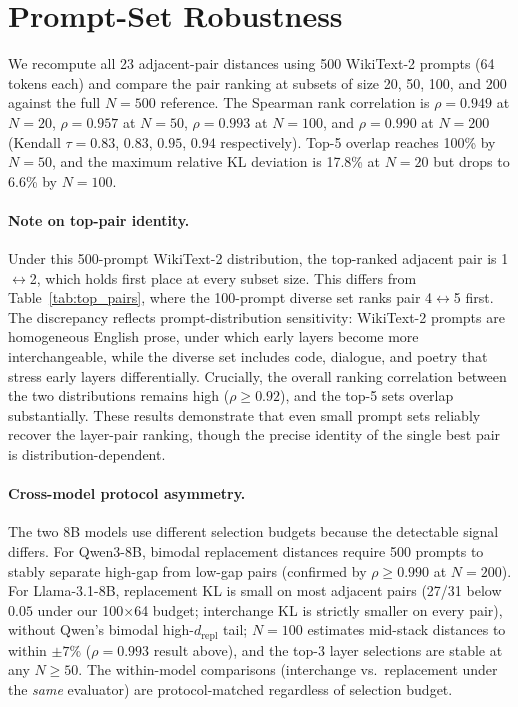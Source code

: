 \documentclass{article}
\begin{document}


\section{Prompt-Set Robustness}
\label{sec:app_prompt_robustness}

We recompute all 23 adjacent-pair distances using 500 WikiText-2 prompts (64 tokens each) and compare the pair ranking at subsets of size 20, 50, 100, and 200 against the full $N{=}500$ reference. The Spearman rank correlation is $\rho = 0.949$ at $N{=}20$, $\rho = 0.957$ at $N{=}50$, $\rho = 0.993$ at $N{=}100$, and $\rho = 0.990$ at $N{=}200$ (Kendall $\tau = 0.83$, $0.83$, $0.95$, $0.94$ respectively). Top-5 overlap reaches 100\% by $N{=}50$, and the maximum relative KL deviation is 17.8\% at $N{=}20$ but drops to 6.6\% by $N{=}100$.

\paragraph{Note on top-pair identity.} Under this 500-prompt WikiText-2 distribution, the top-ranked adjacent pair is 1$\leftrightarrow$2, which holds first place at every subset size. This differs from Table~\ref{tab:top_pairs}, where the 100-prompt diverse set ranks pair 4$\leftrightarrow$5 first. The discrepancy reflects prompt-distribution sensitivity: WikiText-2 prompts are homogeneous English prose, under which early layers become more interchangeable, while the diverse set includes code, dialogue, and poetry that stress early layers differentially. Crucially, the overall ranking correlation between the two distributions remains high ($\rho \geq 0.92$), and the top-5 sets overlap substantially. These results demonstrate that even small prompt sets reliably recover the layer-pair ranking, though the precise identity of the single best pair is distribution-dependent.

\paragraph{Cross-model protocol asymmetry.}
The two 8B models use different selection budgets because the detectable signal differs.
For Qwen3-8B, bimodal replacement distances require 500 prompts to stably separate high-gap from low-gap pairs (confirmed by $\rho \geq 0.990$ at $N{=}200$).
For Llama-3.1-8B, replacement KL is small on most adjacent pairs (27/31 below $0.05$ under our 100$\times$64 budget; interchange KL is strictly smaller on every pair), without Qwen's bimodal high-$d_{\text{repl}}$ tail; $N{=}100$ estimates mid-stack distances to within $\pm 7\%$ ($\rho{=}0.993$ result above), and the top-3 layer selections are stable at any $N{\geq}50$.
The within-model comparisons (interchange vs.\ replacement under the \emph{same} evaluator) are protocol-matched regardless of selection budget.
\end{document}
